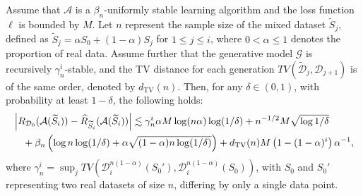 \begin{theorem}\label{theorem_generalization}Assume that $\mathcal{A}$ is a $\beta_n$-uniformly stable learning algorithm and the loss function $\ell$ is bounded by $M$. Let $n$ represent the sample size of the mixed dataset $\widetilde{S}_j$, defined as $\widetilde{S}_j=\alpha S_0+(1-\alpha) S_j$ for $1 \leq j \leq i$, where $0<\alpha\leq 1$ denotes the proportion of real data. Assume further that the generative model $\mathcal{G}$ is recursively $\gamma_n^i$-stable, and the TV distance for each generation $T V(\widetilde{\mathcal{D}}_j, \mathcal{D}_{j+1})$ is of the same order, denoted by $d_{\mathrm{TV}}(n)$. Then, for any $\delta \in(0,1)$, with probability at least $1-\delta$, the following holds:
\begin{align}
&\left|R_{\mathcal{D}_0}(\mathcal{A}(\widetilde{S}_i))-\widehat{R}_{\widetilde{S}_i}(\mathcal{A}(\widetilde{S}_i))\right| \lesssim \gamma_n^i \alpha M\log (n\alpha)\log(1/\delta)+ n^{-1 / 2}M \sqrt{\log 1/\delta} \notag\\
&\quad+\beta_n\left(\log n \log (1/\delta)+\alpha\sqrt{(1-\alpha)n\log (1/\delta)}\right)+d_{\mathrm{TV}}(n)M\left(1-(1-\alpha)^i\right) \alpha^{-1}, \label{mainthero_1}
\end{align}
where $\gamma_n^i= \sup_{j}TV(\mathcal{D}_{i}^{n(1-\alpha)}(S_{0}'),\mathcal{D}_{i}^{n(1-\alpha)}(S_{0}))$, with $S_0$ and $S_0'$ representing two real datasets of size $n$, differing by only a single data point.
\end{theorem}

